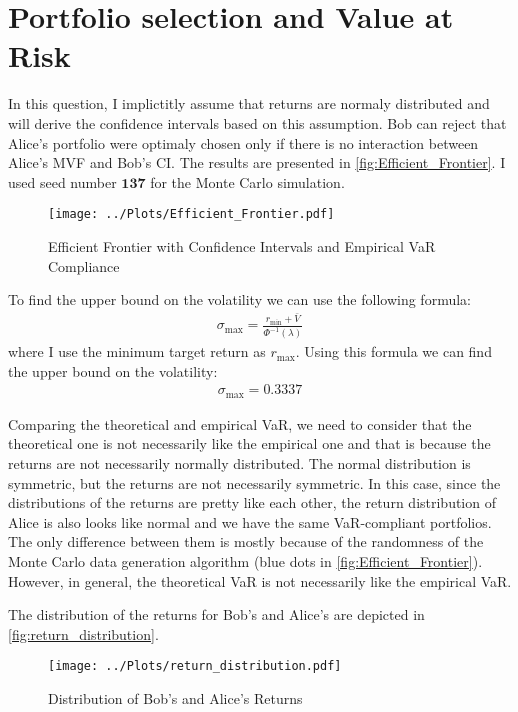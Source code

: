 \documentclass[a4paper,10pt,american]{article}
\begin{document}
\newpage
\section{Portfolio selection and Value at Risk}

In this question, I implictitly assume that returns are normaly distributed and will derive the confidence intervals based on this assumption. Bob can reject that Alice's portfolio were optimaly chosen only if there is no interaction between Alice's MVF and Bob's CI. The results are presented in \autoref{fig:Efficient_Frontier}. I used seed number $\boldsymbol{137}$ for the Monte Carlo simulation.
\begin{figure}[H]
    \centering
    \texttt{[image: ../Plots/Efficient\_Frontier.pdf]}
    \caption{Efficient Frontier with Confidence Intervals and Empirical VaR Compliance}
    \label{fig:Efficient_Frontier}
\end{figure}

To find the upper bound on the volatility we can use the following formula:
\begin{align}
    \sigma_{\text{max}} = \frac{r_{\text{min}}+\bar{V}}{\Phi^{-1}(\lambda)}
\end{align}
where I use the minimum target return as $r_{\text{max}}$. Using this formula we can find the upper bound on the volatility:
\begin{align}
    \sigma_{\text{max}} = 0.3337
\end{align}

Comparing the theoretical and empirical VaR, we need to consider that the theoretical one is not necessarily like the empirical one and that is because the returns are not necessarily normally distributed. The normal distribution is symmetric, but the returns are not necessarily symmetric. In this case, since the distributions of the returns are pretty like each other, the return distribution of Alice is also looks like normal and we have the same VaR-compliant portfolios. The only difference between them is mostly because of the randomness of the Monte Carlo data generation algorithm (blue dots in \autoref{fig:Efficient_Frontier}). However, in general, the theoretical VaR is not necessarily like the empirical VaR. 

The distribution of the returns for Bob's and Alice's are depicted in \autoref{fig:return_distribution}.

\begin{figure}[H]
    \centering
    \texttt{[image: ../Plots/return\_distribution.pdf]}
    \caption{Distribution of Bob's and Alice's Returns}
    \label{fig:return_distribution}
\end{figure}






















% 
\end{document}
